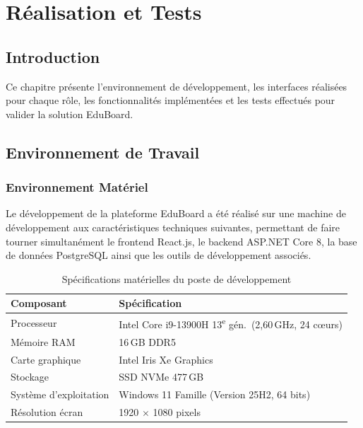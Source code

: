 \chapter{Réalisation et Tests}

\section*{Introduction}

Ce chapitre présente l'environnement de développement, les interfaces réalisées pour
chaque rôle, les fonctionnalités implémentées et les tests effectués pour valider la
solution EduBoard.

\section{Environnement de Travail}

\subsection{Environnement Matériel}

Le développement de la plateforme EduBoard a été réalisé sur une machine de
développement aux caractéristiques techniques suivantes, permettant de faire tourner
simultanément le frontend React.js, le backend ASP.NET Core 8, la base de données
PostgreSQL ainsi que les outils de développement associés.

\begin{table}[H]
  \centering
  \caption{Spécifications matérielles du poste de développement}
  \label{tab:materiel}
  \renewcommand{\arraystretch}{1.3}
  \begin{tabularx}{\textwidth}{|l|X|}
    \hline
    \textbf{Composant} & \textbf{Spécification} \\
    \hline
    Processeur           & Intel Core i9-13900H 13\textsuperscript{e} gén.\ (2,60\,GHz, 24 cœurs) \\
    \hline
    Mémoire RAM          & 16\,GB DDR5 \\
    \hline
    Carte graphique      & Intel Iris Xe Graphics \\
    \hline
    Stockage             & SSD NVMe 477\,GB \\
    \hline
    Système d'exploitation & Windows 11 Famille (Version 25H2, 64 bits) \\
    \hline
    Résolution écran     & 1920 $\times$ 1080 pixels \\
    \hline
  \end{tabularx}
\end{table}


